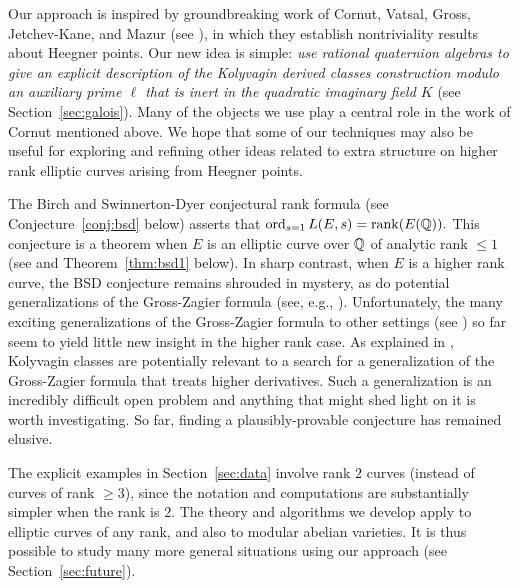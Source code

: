 \documentclass{article} \usepackage[active]{srcltx}
\begin{document}
Our approach is inspired by groundbreaking work of Cornut, Vatsal,
Gross, Jetchev-Kane, and Mazur (see \cite{jetchev-kane:equi,
  cornut:mazur, vatsal:uniform}), in which they establish
nontriviality results about Heegner points.  Our new idea is simple:
{\em use rational quaternion algebras to give an explicit description
  of the Kolyvagin derived classes construction modulo an auxiliary
  prime $\ell$ that is inert in the quadratic imaginary field $K$}
(see Section~\ref{sec:galois}). Many of the objects we use play a
central role in the work of Cornut mentioned above.  We hope that some
of our techniques may also be useful for exploring and refining other
ideas related to extra structure on higher rank elliptic curves
arising from Heegner points.

The Birch and Swinnerton-Dyer conjectural rank formula (see
Conjecture~\ref{conj:bsd} below) asserts that
$
 \operatorname{ord}_{s=1} L(E,s) = \operatorname{rank}(E(\mathbb{Q})).
$
This conjecture is a theorem when $E$ is an elliptic curve over $\mathbb{Q}$
of analytic rank $\leq 1$ (see \cite{breuil-conrad-diamond-taylor,
  gross-zagier, kolyvagin:weil} and Theorem~\ref{thm:bsd1} below).  In
sharp contrast, when $E$ is a higher rank curve, the BSD conjecture
remains shrouded in mystery, as do potential generalizations of the
Gross-Zagier formula (see, e.g., \cite{stein:ggz}).  Unfortunately,
the many exciting generalizations of the Gross-Zagier formula to other
settings (see \cite{bruinier-yang:gz, zhang:gz_formulas, zhang:gzgl2,
  yuan-zhang-zhang:triple}) so far seem to yield little new insight in
the higher rank case.  As explained in \cite{stein:ggz}, Kolyvagin
classes are potentially relevant to a search for a generalization of
the Gross-Zagier formula that treats higher derivatives.  Such a
generalization is an incredibly difficult open problem and anything
that might shed light on it is worth investigating.  So far,
finding a plausibly-provable conjecture has remained elusive.

The explicit examples in Section~\ref{sec:data} involve rank $2$
curves (instead of curves of rank $\geq 3$), since the notation and
computations are substantially simpler when the rank is $2$.  The
theory and algorithms we develop apply to elliptic curves of any rank,
and also to modular abelian varieties.  It is thus possible to study
many more general situations using our approach (see
Section~\ref{sec:future}).
\end{document}
